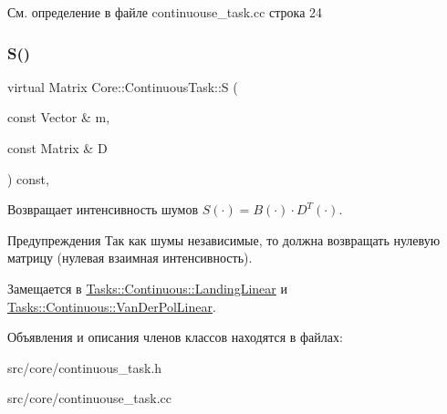 См. определение в файле continuouse\+\_\+task.\+cc строка 24

\hypertarget{class_core_1_1_continuous_task_aa6d652b655628586aeeda03348f633c5}{}\label{class_core_1_1_continuous_task_aa6d652b655628586aeeda03348f633c5} 
\subsubsection{\texorpdfstring{S()}{S()}}
{\footnotesize\ttfamily virtual Matrix Core\+::\+Continuous\+Task\+::S (\begin{DoxyParamCaption}\item[{const Vector \&}]{m,  }\item[{const Matrix \&}]{D }\end{DoxyParamCaption}) const\hspace{0.3cm}{\ttfamily [protected]}, {}}



Возвращает интенсивность шумов $S(\cdot) = B(\cdot) \cdot D^T(\cdot)$. 

\begin{DoxyWarning}{Предупреждения}
Так как шумы независимые, то должна возвращать нулевую матрицу (нулевая взаимная интенсивность). 
\end{DoxyWarning}


Замещается в \hyperlink{class_tasks_1_1_continuous_1_1_landing_linear_a886bc6dd08e4355ab0c491d48f9de002}{Tasks\+::\+Continuous\+::\+Landing\+Linear} и \hyperlink{class_tasks_1_1_continuous_1_1_van_der_pol_linear_aa6cb67403faa3c2f894988aead527234}{Tasks\+::\+Continuous\+::\+Van\+Der\+Pol\+Linear}.



Объявления и описания членов классов находятся в файлах\+:\begin{DoxyCompactItemize}
\item 
src/core/continuous\+\_\+task.\+h\item 
src/core/continuouse\+\_\+task.\+cc\end{DoxyCompactItemize}
